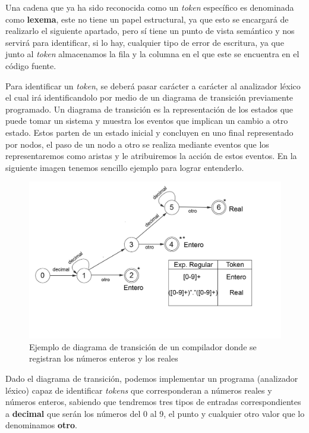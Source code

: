 \documentclass{article}
\begin{document}
    Una cadena que ya ha sido reconocida como un \textit{token} específico es denominada como \textbf{lexema}, este no tiene un
    papel estructural, ya que esto se encargará de realizarlo el siguiente apartado, pero sí tiene un punto de vista semántico
    y nos servirá para identificar, si lo hay, cualquier tipo de error de escritura, ya que junto al \textit{token} almacenamos la
    fila y la columna en el que este se encuentra en el código fuente.

    Para identificar un \textit{token}, se deberá pasar carácter a carácter al analizador léxico el cual irá identificandolo por medio
    de un diagrama de transición previamente programado. Un diagrama de transición es la representación de los estados que puede
    tomar un sistema y muestra los eventos que implican un cambio a otro estado. Estos parten de un estado inicial y concluyen en uno final
    representado por nodos, el paso de un nodo a otro se realiza mediante eventos que los representaremos como aristas y le atribuiremos
    la acción de estos eventos.
    En la siguiente imagen tenemos sencillo ejemplo para lograr entenderlo.

    \begin{figure}[H]
        \includegraphics{imagesMem/diagramaTransicion.png}
        \caption{Ejemplo de diagrama de transición de un compilador donde se registran los números enteros y los reales}
    \end{figure}

    Dado el diagrama de transición, podemos implementar un programa (analizador léxico) capaz de identificar \textit{tokens} que
    corresponderan a números reales y números enteros, sabiendo que tendremos tres tipos de entradas correspondientes a
    \textbf{decimal} que serán los números del 0 al 9, el punto y cualquier otro valor que lo denominamos \textbf{otro}.
\end{document}
